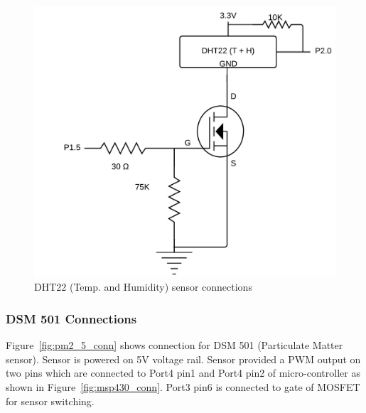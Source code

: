\documentclass[a4paper,12pt]{article}
\begin{document}
\begin{figure}[!ht]
	\centering
	\includegraphics[scale=0.25]{temp.png}
	\caption{DHT22 (Temp. and Humidity) sensor connections}
	\label{fig:dht22_conn}
\end{figure}

\subsubsection{DSM 501 Connections}
Figure~\ref{fig:pm2_5_conn} shows connection for DSM 501 (Particulate Matter sensor). Sensor is powered on 5V voltage rail. Sensor provided a PWM output on two pins which are connected to Port4 pin1 and Port4 pin2 of micro-controller as shown in Figure~\ref{fig:msp430_conn}. Port3 pin6 is connected to gate of MOSFET for sensor switching.
\end{document}
